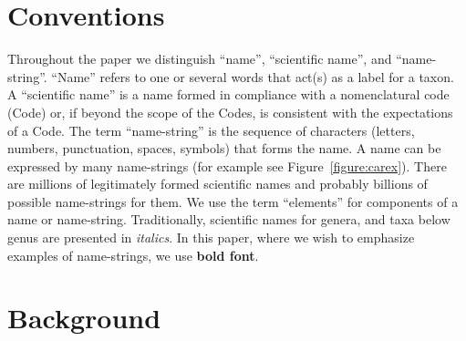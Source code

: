 \documentclass{bmcart}
\begin{document}
\listoftodos[Notes]



\section*{Conventions}

Throughout the paper we distinguish ``name'', ``scientific name'', and ``name-string''. ``Name'' refers to one or several words that act(s) as a label for a taxon. A ``scientific name'' is a name formed in compliance with a nomenclatural code (Code) or, if beyond the scope of the Codes, is consistent with the expectations of a Code. The term ``name-string'' is the sequence of characters (letters, numbers, punctuation, spaces, symbols) that forms the name. A name can be expressed by many name-strings (for example see Figure~\ref{figure:carex}). There are millions of legitimately formed scientific names and probably billions of possible name-strings for them. We use the term ``elements'' for  components of a name or name-string. Traditionally, scientific names for genera, and taxa below genus are presented in \textit{italics}. In this paper, where we wish to emphasize examples of name-strings, we use \textbf{bold font}.

\section*{Background}
\end{document}
